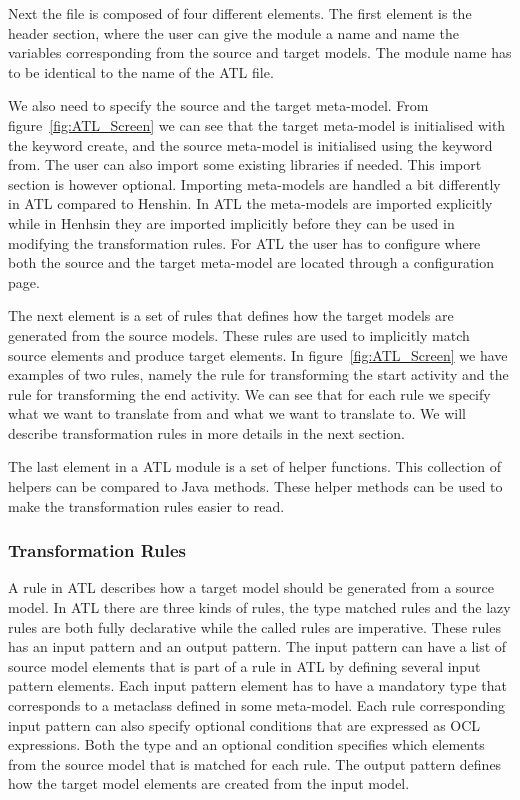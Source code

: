 Next the file is composed of four different elements. The first element is the
header section, where the user can give the module a name and name the variables
corresponding from the source and target models. The module name has to be
identical to the name of the ATL file.

We also need to specify the source and the target meta-model. From
figure~\ref{fig:ATL_Screen} we can see that the target meta-model is initialised 
with the keyword create, and the source meta-model is initialised using the
keyword from. The user can also import some existing libraries if needed. This
import section is however optional. Importing meta-models are handled a bit
differently in ATL compared to Henshin. In ATL the meta-models are imported
explicitly while in Henhsin they are imported implicitly before they can be used
in modifying the transformation rules. For ATL the user has to configure where
both the source and the target meta-model are located through a configuration
page. 

The next element is a set of rules that defines how the target models are
generated from the source models. These rules are used to implicitly match
source elements and produce target elements. In figure~\ref{fig:ATL_Screen} we
have examples of two rules, namely the rule for transforming the start activity
and the rule for transforming the end activity. We can see that for each rule we
specify what we want to translate from and what we want to translate to. We will
describe transformation rules in more details in the next section.

The last element in a ATL module is a set of helper functions. This collection
of helpers can be compared to Java methods. These helper methods can be used to
make the transformation rules easier to read.

\subsubsection*{Transformation Rules}

A rule in ATL describes how a target model should be generated from a source
model. In ATL there are three kinds of rules, the type matched rules and the
lazy rules are both fully declarative while the called rules are imperative.
These rules has an input pattern and an output pattern. The input pattern can
have a list of source model elements that is part of a rule in ATL by defining
several input pattern elements. Each input pattern element has to have a
mandatory type that corresponds to a metaclass defined in some meta-model. Each
rule corresponding input pattern can also specify optional conditions that are
expressed as OCL expressions. Both the type and an optional condition specifies
which elements from the source model that is matched for each rule. The output
pattern defines how the target model elements are created from the input model. 

